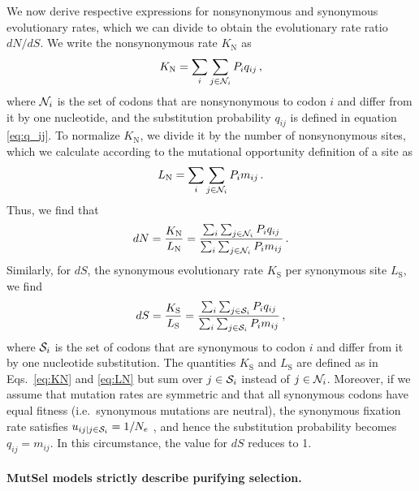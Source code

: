 \documentclass{pnastwo}
\begin{document}
\begin{article}
We now derive respective expressions for nonsynonymous and synonymous evolutionary rates, which we can divide to obtain the evolutionary rate ratio $dN/dS$. We write the nonsynonymous rate $K_\text{N}$ as 
\begin{equation}\label{eq:KN}
	K_\text{N} = \sum_i \sum_{j \in {\cal N}_i} P_i q_{ij} \,,
\end{equation}
where ${\cal N}_i$ is the set of codons that are nonsynonymous to codon $i$ and differ from it by one nucleotide, and the substitution probability $q_{ij}$ is defined in equation \eqref{eq:q_ij}. To normalize $K_\text{N}$, we divide it by the number of nonsynonymous sites, which we calculate according to the mutational opportunity definition of a site \cite{GoldmanYang1994, Yang2006} as 
\begin{equation}\label{eq:LN}
	L_\text{N} = \sum_i \sum_{j \in {\cal N}_i} P_i m_{ij}\, .
\end{equation} Thus, we find that 
\begin{equation}\label{eq:dN}
	dN = \frac{K_\text{N}}{L_\text{N}}=\frac{\sum_i \sum_{j \in {\cal N}_i} P_i q_{ij}} {\sum_i \sum_{j \in {\cal N}_i}P_i m_{ij}}\,.
\end{equation} Similarly, for $dS$, the synonymous evolutionary rate $K_\text{S}$ per synonymous site $L_\text{S}$, we find
\begin{equation}\label{eq:dS}
	dS = \frac{K_\text{S}}{L_\text{S}}=\frac{\sum_i \sum_{j \in {\cal S}_i} P_i q_{ij} } {\sum_i \sum_{j \in {\cal S}_i} P_i m_{ij} }\,,
\end{equation}
where ${\cal S}_i$ is the set of codons that are synonymous to codon $i$ and differ from it by one nucleotide substitution. The quantities $K_\text{S}$ and $L_\text{S}$ are defined as in Eqs.~\eqref{eq:KN} and \eqref{eq:LN} but sum over $j\in {\cal S}_i$ instead of $j\in {\cal N}_i$. Moreover, if we assume that mutation rates are symmetric and that all synonymous codons have equal fitness (i.e.\ synonymous mutations are neutral), the synonymous fixation rate satisfies $u_{ij | j \in {\cal S}_i} = 1/N_e$ \cite{CrowKimura1970}, and hence the substitution probability becomes $q_{ij} = m_{ij}$. In this circumstance, the value for $dS$ reduces to 1.
		
				
\paragraph{MutSel models strictly describe purifying selection.}


\end{article}
\end{document}
